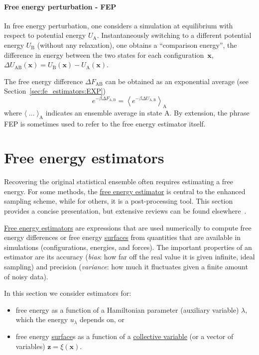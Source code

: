 \documentclass[9pt,review]{livecoms}
\newcommand{\vx}{\mathbf{x}}
\newcommand{\vz}{\mathbf{z}}
\newcommand{\A}{\mathrm{A}}
\newcommand{\B}{\mathrm{B}}
\begin{document}
\hypertarget{ref:FEP} {\paragraph{Free energy perturbation - FEP}}
\label{FEP}

In free energy perturbation, one considers a simulation at equilibrium with respect to potential energy $U_\A$. Instantaneously switching to a different potential energy $U_\B$ (without any relaxation), one obtains a ``comparison energy'', the difference in energy between the two states for each configuration~$\vx$, $\Delta U_{\A\B}(\vx) = U_\B(\vx) - U_\A(\vx)$.

The free energy difference $\Delta F_{\A\B}$ can be obtained as an exponential average (see Section~\ref{sec:fe_estimators:EXP}) \cite{Zwanzig1954}
\begin{equation}
e^{-\beta \Delta F_{\A,\B}} = \left\langle e^{-\beta \Delta U_{\A,\B}}\right\rangle_\A
\end{equation}
where $\langle \;...\; \rangle_\A$ indicates an ensemble average in state $\A$.
By extension, the phrase FEP is sometimes used to refer to the free energy estimator itself.

\section{Free energy estimators}
\label{sec:fe_estimators}

Recovering the original statistical ensemble often requires estimating a free energy. For some methods, the \hyperlink{ref:FEestimator} {free energy estimator} is central to the enhanced sampling scheme, while for others, it is a post-processing tool. This section provides a concise presentation, but extensive reviews can be found elsewhere~\cite{cchipot07:molsim,doi:10.1142/p579,Paliwal_comparison_2011,shirts_comparison_2005,Klimovich_Shirts_Mobley_2015}.

\hyperlink{ref:FEestimator} {Free energy estimators} are expressions that are used numerically to compute free energy differences or free energy \hyperlink{ref:FES} {surfaces} from quantities that are available in simulations (configurations, energies, and forces).
The important properties of an estimator are its accuracy (\textit{bias}: how far off the real value it is given infinite, ideal sampling) and precision (\textit{variance}: how much it fluctuates given a finite amount of noisy data).

In this section we consider estimators for:
\begin{itemize}
    \item free energy as a function of a Hamiltonian parameter (auxiliary variable) $\lambda$, which the energy $u_\lambda$ depends on, or
    \item free energy \hyperlink{ref:FES} {surface}s as a function of a \hyperlink{ref:CV} {collective variable} (or a vector of variables) $\vz = \xi(\vx)$.
\end{itemize}
\end{document}
